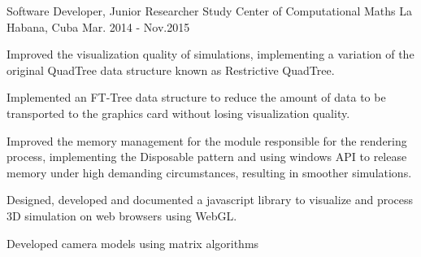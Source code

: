 \begin{cventries}

\cventry
{Software Developer, Junior Researcher} %
{Study Center of Computational Maths} %
{La Habana, Cuba} %
{Mar. 2014 - Nov.2015} %
{ %
\begin{cvitems}
	\item {Improved the visualization quality of simulations, implementing a variation of the original QuadTree data structure known as Restrictive QuadTree.}
	\item {Implemented an FT-Tree data structure to reduce the amount of data to be transported to the graphics card without losing visualization quality.}
	\item {Improved the memory management for the module responsible for the rendering process, implementing the Disposable pattern and using windows API to release memory under high demanding circumstances, resulting in smoother simulations.}
	\item {Designed, developed and documented a javascript library to visualize and process 3D simulation on web browsers
	using WebGL.}
	\item {Developed camera models using matrix algorithms}
\end{cvitems}
}
\end{cventries}